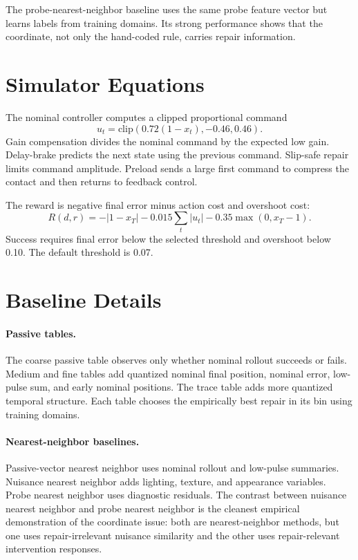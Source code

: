 \documentclass{article}
\begin{document}
The probe-nearest-neighbor baseline uses the same probe feature vector but
learns labels from training domains. Its strong performance shows that the
coordinate, not only the hand-coded rule, carries repair information.

\section{Simulator Equations}

The nominal controller computes a clipped proportional command
\[
u_t = \mathrm{clip}(0.72(1-x_t), -0.46, 0.46).
\]
Gain compensation divides the nominal command by the expected low gain.
Delay-brake predicts the next state using the previous command. Slip-safe repair
limits command amplitude. Preload sends a large first command to compress the
contact and then returns to feedback control.

The reward is negative final error minus action cost and overshoot cost:
\[
R(d,r) = -|1-x_T| - 0.015\sum_t |u_t| - 0.35\max(0,x_T-1).
\]
Success requires final error below the selected threshold and overshoot below
0.10. The default threshold is 0.07.

\section{Baseline Details}

\paragraph{Passive tables.}
The coarse passive table observes only whether nominal rollout succeeds or
fails. Medium and fine tables add quantized nominal final position, nominal
error, low-pulse sum, and early nominal positions. The trace table adds more
quantized temporal structure. Each table chooses the empirically best repair in
its bin using training domains.

\paragraph{Nearest-neighbor baselines.}
Passive-vector nearest neighbor uses nominal rollout and low-pulse summaries.
Nuisance nearest neighbor adds lighting, texture, and appearance variables.
Probe nearest neighbor uses diagnostic residuals. The contrast between nuisance
nearest neighbor and probe nearest neighbor is the cleanest empirical
demonstration of the coordinate issue: both are nearest-neighbor methods, but
one uses repair-irrelevant nuisance similarity and the other uses
repair-relevant intervention responses.
\end{document}
